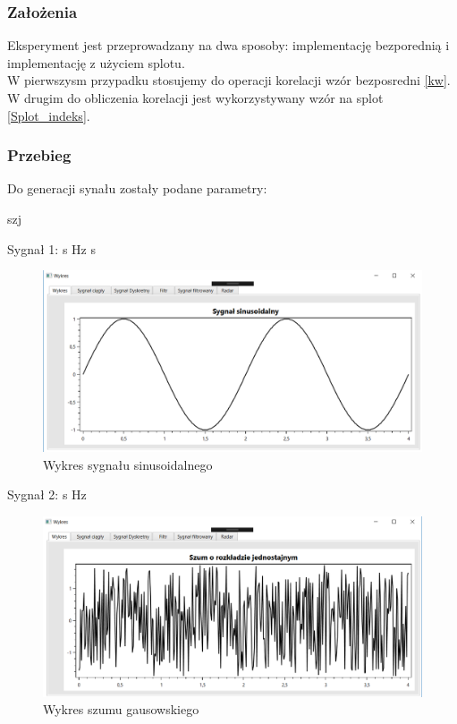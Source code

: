 \documentclass[12pt]{article}
\begin{document}
\subsubsection{Założenia}
Eksperyment jest przeprowadzany na dwa sposoby: implementację bezporednią i implementację z użyciem splotu.
\\W pierwszysm przypadku stosujemy do operacji korelacji wzór bezposredni   \ref{kw}. W drugim do obliczenia korelacji jest wykorzystywany wzór na splot \ref{Splot_indeks}.

\subsubsection{Przebieg}
Do generacji synału zostały podane parametry:

\begin{labeling}{szj}
\item [Sygnał 1:]
 s
 Hz
 s

\begin{figure}[h!]
 \centering
 \includegraphics[width=12.3cm]{sin.PNG}
 \vspace{-0.3cm}
 \caption{Wykres sygnału sinusoidalnego}
 \label{sin}
\end{figure}

\item [Sygnał 2:]
 s
 Hz

\end{labeling}

\begin{figure}[h!]
 \centering
 \includegraphics[width=12.3cm]{szum.PNG}
 \vspace{-0.3cm}
 \caption{Wykres szumu gausowskiego}
 \label{szum}
\end{figure}
 \newpage
\end{document}
